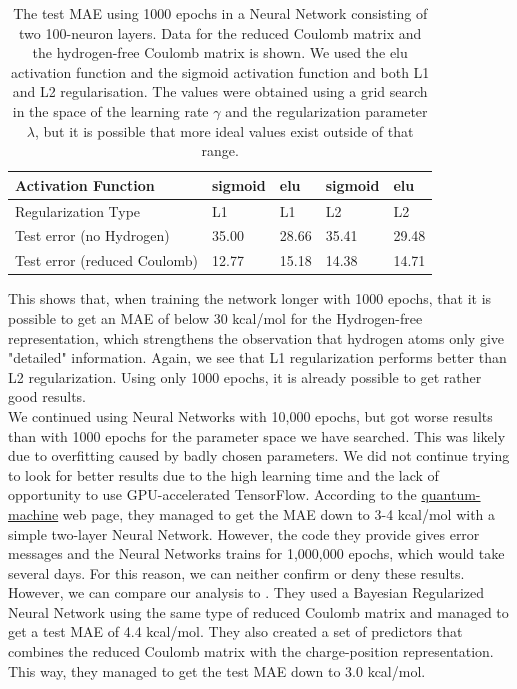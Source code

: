 \documentclass[11pt,a4paper,notitlepage]{article}
\begin{document}
\begin{table}[H]\caption[NN, Test MAE with 1000 epochs]{The test MAE using 1000 epochs in a Neural Network consisting of two 100-neuron layers. Data for the reduced Coulomb matrix and the hydrogen-free Coulomb matrix is shown. We used the elu activation function and the sigmoid activation function and both L1 and L2 regularisation. The values were obtained using a grid search in the space of the learning rate $\gamma$ and the regularization parameter $\lambda$, but it is possible that more ideal values exist outside of that range.}\label{Error_table}
\centering
\begin{tabular}{|l|l|l|l|l|}
\hline

Activation Function          & sigmoid & elu   & sigmoid & elu   \\ \hline
Regularization Type          & L1      & L1    & L2      & L2    \\ \hline
Test error (no Hydrogen)     & 35.00   & 28.66 & 35.41   & 29.48 \\ \hline
Test error (reduced Coulomb) & 12.77   & 15.18 & 14.38   & 14.71 \\ \hline
\end{tabular}
\end{table}
This shows that, when training the network longer with 1000 epochs, that it is possible to get an MAE of below 30 kcal/mol for the Hydrogen-free representation, which strengthens the observation that hydrogen atoms only give "detailed" information. Again, we see that L1 regularization performs better than L2 regularization. Using only 1000 epochs, it is already possible to get rather good results.
\\
We continued using Neural Networks with 10,000 epochs, but got worse results than with 1000 epochs for the parameter space we have searched. This was likely due to overfitting caused by badly chosen parameters. We did not continue trying to look for better results due to the high learning time and the lack of opportunity to use GPU-accelerated TensorFlow. According to the \href{http://quantum-machine.org/datasets/}{quantum-machine} web page, they managed to get the MAE down to 3-4 kcal/mol with a simple two-layer Neural Network. However, the code they provide gives error messages and the Neural Networks trains for 1,000,000 epochs, which would take several days. For this reason, we can neither confirm or deny these results. However, we can compare our analysis to \citep{Atomization_network}. They used a Bayesian Regularized Neural Network using the same type of reduced Coulomb matrix and managed to get a test MAE of 4.4 kcal/mol. They also created a set of predictors that combines the  reduced Coulomb matrix with the charge-position representation. This way, they managed to get the test MAE down to 3.0 kcal/mol.
\end{document}
